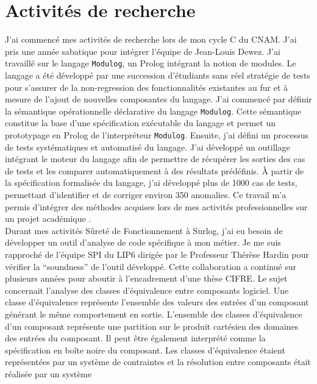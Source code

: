 \documentclass[a4paper,12pt]{article}
\newcommand{\Modulog}{{\tt Modulog}}
\begin{document}
\newpage
\section{Activit\'es de recherche}
J'ai commenc\'e mes activit\'es de recherche lors de mon cycle C du
CNAM. J'ai pris une ann\'ee sabatique pour int\'egrer l'\'equipe de
Jean-Louis Dewez. J'ai travaill\'e sur le langage \Modulog, un Prolog
int\'egrant la notion de modules. Le langage a \'et\'e d\'evelopp\'e
par une succession d'\'etudiants sans r\'eel strat\'egie de tests pour
s'assurer de la non-regression des fonctionnalit\'es existantes au fur
et \`a mesure de l'ajout de nouvelles composantes du langage. J'ai
commenc\'e par d\'efinir la s\'emantique op\'erationnelle
d\'eclarative du langage \Modulog. Cette s\'emantique constitue la
base d'une sp\'ecification ex\'ecutable du langage et permet un
prototypage en Prolog de l'interpr\'eteur \Modulog.  Ensuite, j'ai
d\'efini un processus de tests syst\'ematiques et automatis\'e du
langage. J'ai d\'evelopp\'e un outillage int\'egrant le moteur du
langage afin de permettre de r\'ecup\'erer les sorties des cas de
tests et les comparer automatiquement \`a des r\'esultats
pr\'ed\'efinis. \`A partir de la sp\'ecification formalis\'ee du
langage, j'ai d\'evelopp\'e plus de 1000 cas de tests, permettant
d'identifier et de corriger environ 350 anomalies. Ce travail m'a
permis d'int\'egrer des m\'ethodes acquises lors de mes activit\'es
professionnelles sur un projet acad\'emique \cite{Ing-PAyrault}.
\\
Durant mes activit\'es S\^uret\'e de Fonctionnement \`a Surlog, j'ai
eu besoin de d\'evelopper un outil d'analyse de code sp\'ecifique \`a
mon m\'etier. Je me suis rapproch\'e de l'\'equipe SPI du LIP6
dirig\'ee par le Professeur Th\'er\`ese Hardin pour v\'erifier la
``soundness'' de l'outil d\'evelopp\'e.  Cette collaboration a
continu\'e sur plusieurs ann\'ees pour aboutir \`a l'encadrement d'une
th\`ese CIFRE. Le sujet concernait l'analyse des classes
d'\'equivalence entre composants logiciel. Une classe d'\'equivalence
repr\'esente l'ensemble des valeurs des entr\'ees d'un composant
g\'en\'erant le m\^eme comportement en sortie. L'ensemble des classes
d'\'equivalence d'un composant repr\'esente une partition sur le
produit cart\'esien des domaines des entr\'ees du composant. Il peut
\^etre \'egalement interpr\'et\'e comme la sp\'ecification en bo\^ite
noire du composant. Les classes d'\'equivalence \'etaient
repr\'esent\'ees par un syst\`eme de contraintes et la r\'esolution
entre composants \'etait r\'ealis\'ee par un syst\`eme
\end{document}
